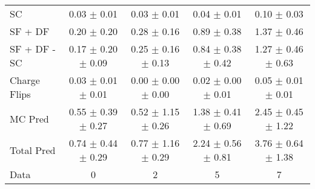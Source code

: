 \begin{tabular}{l|cccc}
                                 SC &  0.03 $\pm$  0.01 &  0.03 $\pm$  0.01 &  0.04 $\pm$  0.01 &  0.10 $\pm$  0.03 \\
                            SF + DF &  0.20 $\pm$  0.20 &  0.28 $\pm$  0.16 &  0.89 $\pm$  0.38 &  1.37 $\pm$  0.46 \\
\hline
                       SF + DF - SC &  0.17 $\pm$  0.20 $\pm$  0.09 &  0.25 $\pm$  0.16 $\pm$  0.13 &  0.84 $\pm$  0.38 $\pm$  0.42 &  1.27 $\pm$  0.46 $\pm$  0.63 \\
\hline\hline
                       Charge Flips &  0.03 $\pm$  0.01 $\pm$  0.01 &  0.00 $\pm$  0.00 $\pm$  0.00 &  0.02 $\pm$  0.00 $\pm$  0.01 &  0.05 $\pm$  0.01 $\pm$  0.01 \\
\hline
                            MC Pred &  0.55 $\pm$  0.39 $\pm$  0.27 &  0.52 $\pm$  1.15 $\pm$  0.26 &  1.38 $\pm$  0.41 $\pm$  0.69 &  2.45 $\pm$  0.45 $\pm$  1.22 \\
\hline
                         Total Pred &  0.74 $\pm$  0.44 $\pm$  0.29 &  0.77 $\pm$  1.16 $\pm$  0.29 &  2.24 $\pm$  0.56 $\pm$  0.81 &  3.76 $\pm$  0.64 $\pm$  1.38 \\
\hline\hline
                               Data &     0 &     2 &     5 &     7 \\
\hline\hline
\end{tabular}


